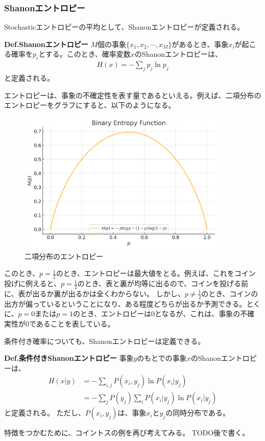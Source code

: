\documentclass[a4paper,11pt]{jsarticle}
\numberwithin{equation}{section}
\begin{document}
\subsubsection{Shanonエントロピー}
Stochasticエントロピーの平均として、Shanonエントロピーが定義される。

\begin{itembox}[l]{\textbf{Def.Shanonエントロピー}}
    $M$個の事象$\{x_1, x_2, \cdots, x_M\}$があるとき、事象$x_i$が起こる確率を$p_i$とする。このとき、確率変数$x$のShanonエントロピーは、
    \begin{align}
        H(x) = -\sum_{j} p_j \ln p_j
    \end{align}
    と定義される。
\end{itembox}
エントロピーは、事象の不確定性を表す量であるといえる。例えば、二項分布のエントロピーをグラフにすると、以下のようになる。
\begin{figure}[H]
    \begin{center}
    \includegraphics[width=100mm]{entropy.png}
    \end{center}
    \caption{二項分布のエントロピー}
    \label{fig:entropy}
\end{figure}
\indent
このとき、$p=\frac{1}{2}$のとき、エントロピーは最大値をとる。例えば、これをコイン投げに例えると、$p=\frac{1}{2}$のとき、表と裏が均等に出るので、コインを投げる前に、表が出るか裏が出るかは全くわからない。
しかし、$p\neq \frac{1}{2}$のとき、コインの出方が偏っているということになり、ある程度どちらが出るか予測できる。とくに、$p=0$または$p=1$のとき、エントロピーは0となるが、これは、事象の不確実性が0であることを表している。

条件付き確率についても、Shanonエントロピーは定義できる。
\begin{itembox}[l]{\textbf{Def.条件付きShanonエントロピー}}
    事象$y$のもとでの事象$x$のShanonエントロピーは、
    \begin{align}
        H(x|y) &= -\sum_{i,j}P(x_i,y_j) \ln P(x_i|y_j)\\
        &= -\sum_{j}P(y_j) \sum_{i}P(x_i|y_j) \ln P(x_i|y_j)
    \end{align}
    と定義される。
    ただし、$P(x_i,y_j)$は、事象$x_i$と$y_j$の同時分布である。
\end{itembox}
特徴をつかむために、コイントスの例を再び考えてみる。
TODO後で書く。\\
\end{document}
